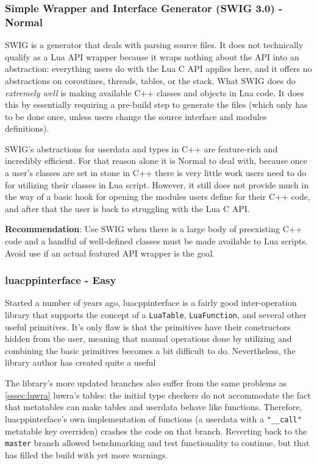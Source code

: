 \documentclass[conference,compsoc]{IEEEtran}
\begin{document}
\subsubsection{Simple Wrapper and Interface Generator (SWIG 3.0) - Normal}

SWIG\cite{swig} is a generator that deals with parsing source files. It does not technically qualify as a Lua API wrapper because it wraps nothing about the API into an abstraction: everything users do with the Lua C API applies here, and it offers no abstractions on coroutines, threads, tables, or the stack. What SWIG does do \emph{extremely well} is making available C++ classes and objects in Lua code. It does this by essentially requiring a pre-build step to generate the files (which only has to be done once, unless users change the source interface and modules definitions).

SWIG's abstractions for userdata and types in C++ are feature-rich and incredibly efficient. For that reason alone it is Normal to deal with, because once a user's classes are set in stone in C++ there is very little work users need to do for utilizing their classes in Lua script. However, it still does not provide much in the way of a basic hook for opening the modules users define for their C++ code, and after that the user is back to struggling with the Lua C API.

\textbf{Recommendation}: Use SWIG when there is a large body of preexisting C++ code and a handful of well-defined classes must be made available to Lua scripts. Avoid use if an actual featured API wrapper is the goal.

\subsubsection{luacppinterface - Easy}\label{sssec:luacppinterface}

Started a number of years ago, luacppinterface\cite{luacppinterface} is a fairly good inter-operation library that supports the concept of a \lstinline|LuaTable|, \lstinline|LuaFunction|, and several other useful primitives. It's only flaw is that the primitives have their constructors hidden from the user, meaning that manual operations done by utilizing and combining the basic primitives becomes a bit difficult to do. Nevertheless, the library author has created quite a useful

The library's more updated branches also suffer from the same problems as \cref{sssec:luwra} luwra's tables: the initial type checkers do not accommodate the fact that metatables can make tables and userdata behave like functions. Therefore, luacppinterface's own implementation of functions (a userdata with a \lstinline|"__call"| metatable key overriden) crashes the code on that branch. Reverting back to the \lstinline|master| branch allowed benchmarking and test functionality to continue, but that has filled the build with yet more warnings.
\end{document}

